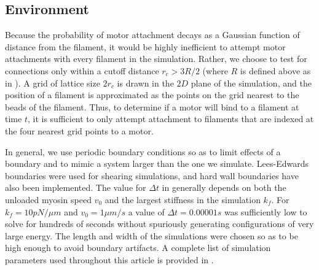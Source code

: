 \documentclass[12pt]{article}
\begin{document}
\subsection{Environment}
\par
Because the probability of motor attachment decays as a Gaussian function of distance from the filament, it would be highly inefficient to attempt motor attachments with every filament in the simulation.  Rather, we choose to test for connections only within a cutoff distance
$r_c>3R/2$ (where $R$ is defined above as in ). A grid of lattice size $2r_c$ is drawn in the $2D$ plane of the simulation, and the position of a filament is approximated as the points on the grid nearest to the beads of the filament. Thus, to determine if a motor will bind to a filament at time $t$, it is sufficient to only attempt attachment to filaments that are indexed at the four nearest grid points to a motor. 
\par
In general, we use periodic boundary conditions so as to limit effects of a boundary and to mimic a system larger than the one we simulate. Lees-Edwards boundaries \cite{allen} were used for shearing simulations, and hard wall boundaries have also been implemented.
The value for $\Delta t$ in  generally depends on both the unloaded myosin speed
$v_0$ and the largest stiffness in the simulation $k_f$. For $k_f = 10pN/\mu m$ and $v_0=1\mu m/s$ a value of $\Delta t = 0.00001 s$ was sufficiently low to solve  for hundreds of seconds without spuriously generating configurations of very large energy.
The length and width of the simulations were chosen so as to be high enough to avoid boundary artifacts. 
A complete list of simulation parameters used throughout this article is provided in . 
\end{document}
